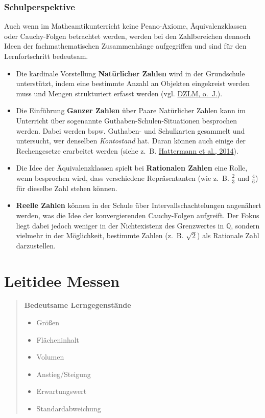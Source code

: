 \documentclass[
  ngerman,
]{scrbook}
\providecommand{\tightlist}{%
  \setlength{\itemsep}{0pt}\setlength{\parskip}{0pt}}
\theoremstyle{definition}
\theoremstyle{definition}
\theoremstyle{definition}
\theoremstyle{definition}
\theoremstyle{remark}
\begin{document}
\hypertarget{schulperspektive}{%
\subsection{Schulperspektive}\label{schulperspektive}}

Auch wenn im Matheamtikunterricht keine Peano-Axiome, Äquivalenzklassen oder Cauchy-Folgen betrachtet werden, werden bei den Zahlbereichen dennoch Ideen der fachmathematischen Zusammenhänge aufgegriffen und sind für den Lernfortschritt bedeutsam.

\begin{itemize}
\item
  Die kardinale Vorstellung \textbf{Natürlicher Zahlen} wird in der Grundschule unterstützt, indem eine bestimmte Anzahl an Objekten eingekreist werden muss und Mengen strukturiert erfasst werden (vgl. \protect\hyperlink{ref-DZLM}{DZLM, o.~J.}).
\item
  Die Einführung \textbf{Ganzer Zahlen} über Paare Natürlicher Zahlen kann im Unterricht über sogenannte Guthaben-Schulen-Situationen besprochen werden. Dabei werden bspw. Guthaben- und Schulkarten gesammelt und untersucht, wer denselben \emph{Kontostand} hat. Daran können auch einige der Rechengesetze erarbeitet werden (siehe z.~B. \protect\hyperlink{ref-Hattermann2014}{Hattermann et al., 2014}).
\item
  Die Idee der Äquivalenzklassen spielt bei \textbf{Rationalen Zahlen} eine Rolle, wenn besprochen wird, dass verschiedene Repräsentanten (wie z.~B. \(\frac{2}{3}\) und \(\frac{4}{6}\)) für dieselbe Zahl stehen können.
\item
  \textbf{Reelle Zahlen} können in der Schule über Intervallschachtelungen angenähert werden, was die Idee der konvergierenden Cauchy-Folgen aufgreift. Der Fokus liegt dabei jedoch weniger in der Nichtexistenz des Grenzwertes in \(\mathbb{Q}\), sondern vielmehr in der Möglichkeit, bestimmte Zahlen (z.~B. \(\sqrt{2}\)) als Rationale Zahl darzustellen.
\end{itemize}

\hypertarget{leitidee-messen}{%
\chapter{Leitidee Messen}\label{leitidee-messen}}

\begin{quote}
\textbf{Bedeutsame Lerngegenstände}

\begin{itemize}
\tightlist
\item
  Größen
\item
  Flächeninhalt
\item
  Volumen
\item
  Anstieg/Steigung
\item
  Erwartungswert
\item
  Standardabweichung
\end{itemize}
\end{quote}
\end{document}
